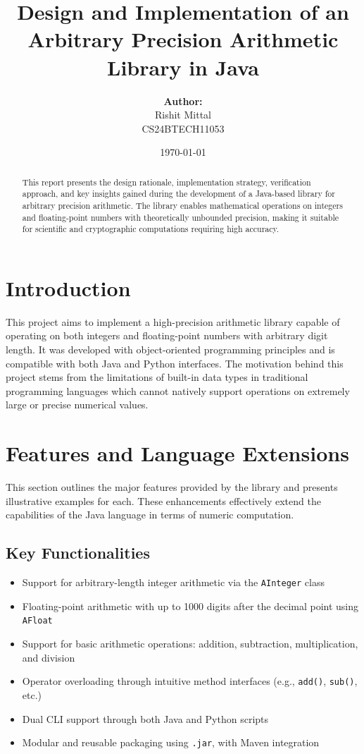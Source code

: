 \documentclass[12pt]{article}
\title{\textbf{Design and Implementation of an Arbitrary Precision Arithmetic Library in Java}}
\author{
    \textbf{Author:} \\
    Rishit Mittal \\
    CS24BTECH11053\\
}
\date{\today}
\begin{document}
\maketitle

\begin{abstract}
This report presents the design rationale, implementation strategy, verification approach, and key insights gained during the development of a Java-based library for arbitrary precision arithmetic. The library enables mathematical operations on integers and floating-point numbers with theoretically unbounded precision, making it suitable for scientific and cryptographic computations requiring high accuracy.
\end{abstract}

\tableofcontents
\newpage

\section{Introduction}
This project aims to implement a high-precision arithmetic library capable of operating on both integers and floating-point numbers with arbitrary digit length. It was developed with object-oriented programming principles and is compatible with both Java and Python interfaces. The motivation behind this project stems from the limitations of built-in data types in traditional programming languages which cannot natively support operations on extremely large or precise numerical values.

\section{Features and Language Extensions}
\label{sec:features}
This section outlines the major features provided by the library and presents illustrative examples for each. These enhancements effectively extend the capabilities of the Java language in terms of numeric computation.

\subsection*{Key Functionalities}
\begin{itemize}[noitemsep]
    \item Support for arbitrary-length integer arithmetic via the \texttt{AInteger} class
    \item Floating-point arithmetic with up to 1000 digits after the decimal point using \texttt{AFloat}
    \item Support for basic arithmetic operations: addition, subtraction, multiplication, and division
    \item Operator overloading through intuitive method interfaces (e.g., \texttt{add()}, \texttt{sub()}, etc.)
    \item Dual CLI support through both Java and Python scripts
    \item Modular and reusable packaging using \texttt{.jar}, with Maven integration
\end{itemize}
\end{document}
